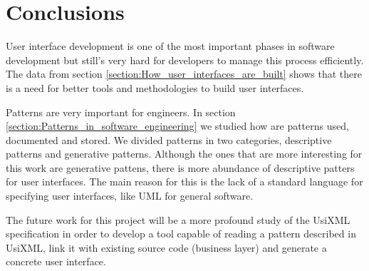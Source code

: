 \section{Conclusions}
User interface development is one of the most important phases in software development but still's very hard for developers to manage this process efficiently. The data from section \ref{section:How_user_interfaces_are_built} shows that there is a need for better tools and methodologies to build user interfaces.

Patterns are very important for engineers. In section \ref{section:Patterns_in_software_engineering} we studied how are patterns used, documented and stored. We divided patterns in two categories, descriptive patterns and generative patterns. Although the ones that are more interesting for this work are generative pattens, there is more abundance of descriptive patters for user interfaces. The main reason for this is the lack of a standard language for specifying user interfaces, like UML for general software.

The future work for this project will be a more profound study of the UsiXML specification in order to develop a tool capable of reading a pattern described in UsiXML, link it with existing source code (business layer) and generate a concrete user interface.